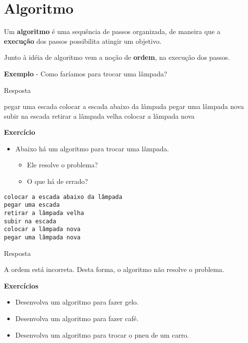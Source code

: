 \documentclass[
  letterpaper,
  DIV=11,
  numbers=noendperiod]{scrreprt}
\newenvironment{Shaded}{\begin{snugshade}}{\end{snugshade}}
\newcommand{\ExtensionTok}[1]{\textcolor[rgb]{0.00,0.23,0.31}{#1}}
\newcommand{\NormalTok}[1]{\textcolor[rgb]{0.00,0.23,0.31}{#1}}
\providecommand{\tightlist}{%
  \setlength{\itemsep}{0pt}\setlength{\parskip}{0pt}}\usepackage{longtable,booktabs,array}
\begin{document}

\chapter{Algoritmo}\label{algoritmo}

Um \textbf{algoritmo} é uma sequência de passos organizada, de maneira
que a \textbf{execução} dos passos possibilita atingir um objetivo.

Junto à idéia de algoritmo vem a noção de \textbf{ordem}, na execução
dos passos.

\textbf{Exemplo} - Como faríamos para trocar uma lâmpada?

Resposta

\begin{Shaded}
\begin{Highlighting}[]
\ExtensionTok{pegar}\NormalTok{ uma escada}
\ExtensionTok{colocar}\NormalTok{ a escada abaixo da lâmpada}
\ExtensionTok{pegar}\NormalTok{ uma lâmpada nova}
\ExtensionTok{subir}\NormalTok{ na escada}
\ExtensionTok{retirar}\NormalTok{ a lâmpada velha}
\ExtensionTok{colocar}\NormalTok{ a lâmpada nova}
\end{Highlighting}
\end{Shaded}

\textbf{Exercício}

\begin{itemize}
\tightlist
\item
  Abaixo há um algoritmo para trocar uma lâmpada.

  \begin{itemize}
  \tightlist
  \item
    Ele resolve o problema?\\
  \item
    O que há de errado?
  \end{itemize}
\end{itemize}

\begin{verbatim}
colocar a escada abaixo da lâmpada
pegar uma escada
retirar a lâmpada velha
subir na escada
colocar a lâmpada nova
pegar uma lâmpada nova
\end{verbatim}

Resposta

A ordem está incorreta. Desta forma, o algoritmo não resolve o problema.

\textbf{Exercícios}

\begin{itemize}
\tightlist
\item
  Desenvolva um algoritmo para fazer gelo.
\item
  Desenvolva um algoritmo para fazer café.
\item
  Desenvolva um algoritmo para trocar o pneu de um carro.
\end{itemize}
\end{document}
